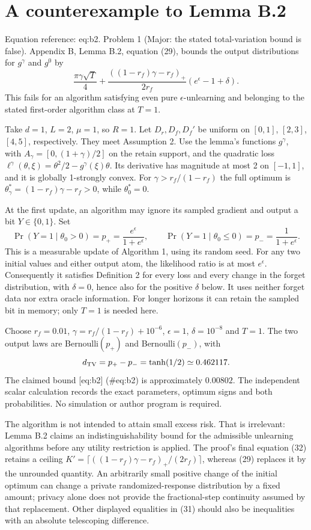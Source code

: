 \documentclass[10pt]{article}
\begin{document}
\section*{A counterexample to Lemma B.2}
Equation reference: eq:b2. Problem 1 (Major: the stated total-variation bound is false).  Appendix B, Lemma B.2, equation (29), bounds the output distributions for \(g^\gamma\) and \(g^0\) by \[
 \frac{\pi\gamma\sqrt T}{4}
 +\frac{((1-r_f)\gamma-r_f)_+}{2r_f}(e^\epsilon-1+\delta).\] This fails for an algorithm satisfying even pure \(\epsilon\)-unlearning and belonging to the stated first-order algorithm class at \(T=1\).\par
Take \(d=1\), \(L=2\), \(\mu=1\), so \(R=1\). Let \(D_r,D_f,D_f'\) be uniform on \([0,1]\), \([2,3]\), \([4,5]\), respectively. They meet Assumption 2. Use the lemma’s functions \(g^\gamma\), with \(A_\gamma=[0,(1+\gamma)/2]\) on the retain support, and the quadratic loss \(\ell^\gamma(\theta,\xi)=\theta^2/2-g^\gamma(\xi)\theta\). Its derivative has magnitude at most 2 on \([-1,1]\), and it is globally 1-strongly convex. For \(\gamma>r_f/(1-r_f)\) the full optimum is \(\theta^*_\gamma=(1-r_f)\gamma-r_f>0\), while \(\theta^*_0=0\).\par
At the first update, an algorithm may ignore its sampled gradient and output a bit \(Y\in\{0,1\}\). Set \[\Pr(Y=1\mid\theta_0>0)=p_+=\frac{e^\epsilon}{1+e^\epsilon},\qquad
 \Pr(Y=1\mid\theta_0\leq0)=p_-=\frac1{1+e^\epsilon}.\] This is a measurable update of Algorithm 1, using its random seed. For any two initial values and either output atom, the likelihood ratio is at most \(e^\epsilon\). Consequently it satisfies Definition 2 for every loss and every change in the forget distribution, with \(\delta=0\), hence also for the positive \(\delta\) below. It uses neither forget data nor extra oracle information. For longer horizons it can retain the sampled bit in memory; only \(T=1\) is needed here.\par
Choose \(r_f=0.01\), \(\gamma=r_f/(1-r_f)+10^{-6}\), \(\epsilon=1\), \(\delta=10^{-8}\) and \(T=1\). The two output laws are Bernoulli\((p_+)\) and Bernoulli\((p_-)\), with \[d_{\rm TV}=p_+-p_-=\tanh(1/2)\simeq0.462117.\] The claimed bound [eq:b2] (\#eq:b2) is approximately \(0.00802\). The independent scalar calculation records the exact parameters, optimum signs and both probabilities. No simulation or author program is required.\par
The algorithm is not intended to attain small excess risk. That is irrelevant: Lemma B.2 claims an indistinguishability bound for the admissible unlearning algorithms before any utility restriction is applied. The proof’s final equation (32) retains a ceiling \(K'=\lceil((1-r_f)\gamma-r_f)_+/(2r_f)\rceil\), whereas (29) replaces it by the unrounded quantity. An arbitrarily small positive change of the initial optimum can change a private randomized-response distribution by a fixed amount; privacy alone does not provide the fractional-step continuity assumed by that replacement. Other displayed equalities in (31) should also be inequalities with an absolute telescoping difference.\par
\end{document}
